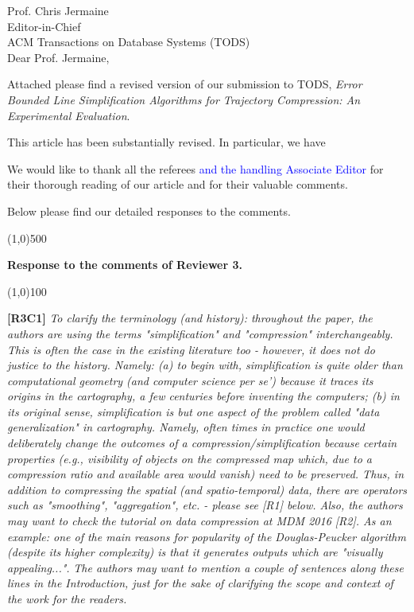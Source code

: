 \documentclass{letter}
\begin{document}
Prof. {Chris Jermaine} \\
Editor-in-Chief		\\
ACM Transactions on Database Systems (TODS)	\\



Dear Prof. Jermaine,

Attached please find a revised version of our submission to TODS, \emph{Error Bounded Line Simplification Algorithms for Trajectory Compression: An Experimental Evaluation}.


 This article has been substantially revised. In particular, we have



We would like to thank all the referees \textcolor{blue}{and the handling Associate Editor} for their thorough reading of our article and for their valuable comments.

Below please find our detailed responses to the comments.





\line(1,0){500}

\textbf{Response to the comments of Reviewer 3.}

\line(1,0){100}

\textbf{[R3C1]} \emph{
To clarify the terminology (and history): throughout the paper, the authors are using the terms "simplification" and "compression" interchangeably. This is often the case in the existing literature too - however, it does not do justice to the history. Namely: (a) to begin with, simplification is quite older than computational geometry (and computer science per se') because it traces its origins in the cartography, a few centuries before inventing the computers; (b) in its original sense, simplification is but one aspect of the problem called "data generalization" in cartography. Namely, often times in practice one would deliberately change the outcomes of a compression/simplification because certain properties (e.g., visibility of objects on the compressed map which, due to a compression ratio and available area would vanish) need to be preserved. Thus, in addition to compressing the spatial (and spatio-temporal) data, there are operators such as "smoothing", "aggregation", etc. - please see [R1] below. Also, the authors may want to check the tutorial on data compression at MDM 2016 [R2]. As an example: one of the main reasons for popularity of the Douglas-Peucker algorithm (despite its higher complexity) is that it generates outputs which are "visually appealing...".}
%
\emph{The authors may want to mention a couple of sentences along these lines in the Introduction, just for the sake of clarifying the scope and context of the work for the readers.}
\end{document}
